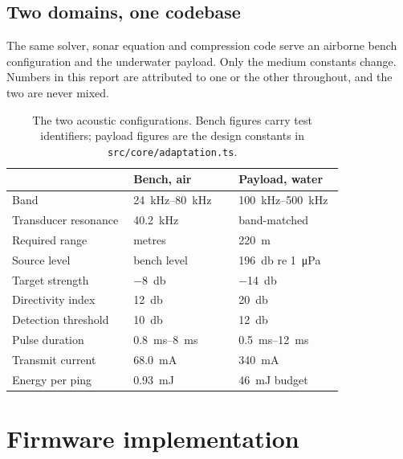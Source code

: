 \documentclass[conference,a4paper]{IEEEtran}
\begin{document}
\subsection{Two domains, one codebase}

The same solver, sonar equation and compression code serve an airborne bench
configuration and the underwater payload. Only the medium constants change.
Numbers in this report are attributed to one or the other throughout, and the
two are never mixed.

\begin{table}[t]
\centering
\small
\begin{tabularx}{\linewidth}{L{0.30\linewidth}R{0.26\linewidth}R{0.26\linewidth}}
\toprule
& \textbf{Bench, air} & \textbf{Payload, water} \\
\midrule
Band & \SIrange{24}{80}{\kilo\hertz} & \SIrange{100}{500}{\kilo\hertz} \\
Transducer resonance & \SI{40.2}{\kilo\hertz}  & band-matched \\
Required range & metres & \SI{220}{\metre} \\
Source level & bench level & \SI{196}{\decibel} re \SI{1}{\micro\pascal} \\
Target strength & \SI{-8}{\decibel} & \SI{-14}{\decibel} \\
Directivity index & \SI{12}{\decibel} & \SI{20}{\decibel} \\
Detection threshold & \SI{10}{\decibel} & \SI{12}{\decibel} \\
Pulse duration & \SIrange{0.8}{8}{\milli\second} & \SIrange{0.5}{12}{\milli\second} \\
Transmit current & \SI{68.0}{\milli\ampere}  & \SI{340}{\milli\ampere} \\
Energy per ping & \SI{0.93}{\milli\joule}  & \SI{46}{\milli\joule} budget \\
\bottomrule
\end{tabularx}
\caption{The two acoustic configurations. Bench figures carry test identifiers;
payload figures are the design constants in \texttt{src/core/adaptation.ts}.}
\label{tab:domains}
\end{table}

\section{Firmware implementation}
\label{sec:firmware}
\end{document}
